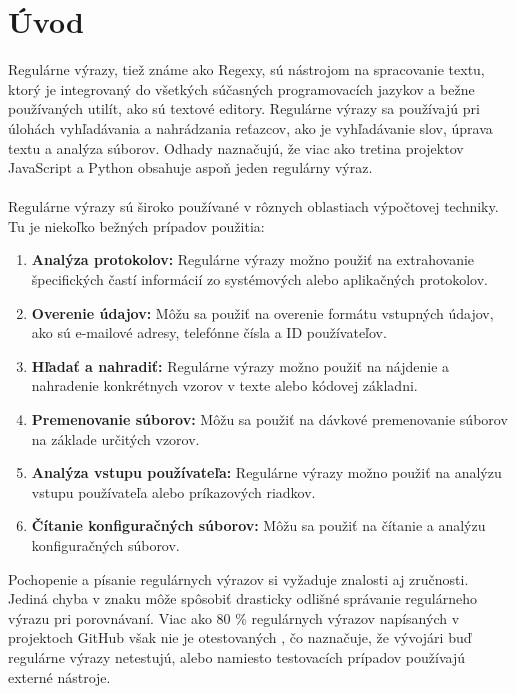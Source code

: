 \documentclass[10pt,twoside,slovak,a4paper]{article}
\begin{document}
\section{Úvod}
Regulárne výrazy, tiež známe ako Regexy, sú nástrojom na spracovanie textu, ktorý je integrovaný do všetkých súčasných programovacích jazykov a bežne používaných utilít, ako sú textové editory. Regulárne výrazy sa používajú pri úlohách vyhľadávania a nahrádzania reťazcov, ako je vyhľadávanie slov, úprava textu a analýza súborov. \cite{Chapman2017}
Odhady naznačujú, že viac ako tretina projektov JavaScript a Python obsahuje aspoň jeden regulárny výraz. \cite{Michael2019} \\
\\
Regulárne výrazy sú široko používané v rôznych oblastiach výpočtovej techniky. Tu je niekoľko bežných prípadov použitia:
\begin{enumerate}
	\item \textbf{Analýza protokolov:} Regulárne výrazy možno použiť na extrahovanie špecifických častí informácií zo systémových alebo aplikačných protokolov.
	\item \textbf{Overenie údajov:} Môžu sa použiť na overenie formátu vstupných údajov, ako sú e-mailové adresy, telefónne čísla a ID používateľov.
	\item \textbf{Hľadať a nahradiť:} Regulárne výrazy možno použiť na nájdenie a nahradenie konkrétnych vzorov v texte alebo kódovej základni.
	\item \textbf{Premenovanie súborov:} Môžu sa použiť na dávkové premenovanie súborov na základe určitých vzorov.
	\item \textbf{Analýza vstupu používateľa:} Regulárne výrazy možno použiť na analýzu vstupu používateľa alebo príkazových riadkov.
	\item \textbf{Čítanie konfiguračných súborov:} Môžu sa použiť na čítanie a analýzu konfiguračných súborov.
\end{enumerate}
Pochopenie a písanie regulárnych výrazov si vyžaduje znalosti aj zručnosti. \cite{Chapman2016}
Jediná chyba v znaku môže spôsobiť drasticky odlišné správanie regulárneho výrazu pri porovnávaní. \cite{Wang2019}
Viac ako 80 \% regulárnych výrazov napísaných v projektoch GitHub však nie je otestovaných \cite{Wang2018}, čo naznačuje, že vývojári buď regulárne výrazy netestujú, alebo namiesto testovacích prípadov používajú externé nástroje. \cite{Wang2019} \\
\\
\end{document}
